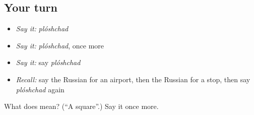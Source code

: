 \subsection*{Your turn}
\begin{itemize}
\raggedright
  \item \emph{Say it:} \emph{plóshchad}
  \item \emph{Say it:} \emph{plóshchad}, once more
  \item \emph{Say it:} say \emph{plóshchad}
  \item \emph{Recall:} say the Russian for an airport, then the Russian for a stop, then say \emph{plóshchad} again
\end{itemize}

\begin{tcolorbox}[breakable,colback=teal!4,colframe=teal!35!black,title={Before you move on}]
What does  mean? (\textquotedblleft{}A square\textquotedblright{}.) Say it once more.
\end{tcolorbox}
